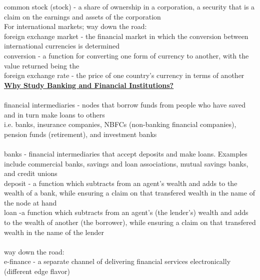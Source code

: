 \documentclass[12pt]{article}
\begin{document}
\noindent common stock (stock) - a share of ownership in a corporation, a security that is a claim on the earnings and assets of the corporation\\

\noindent For international markets; way down the road:\\
\noindent foreign exchange market - the financial market in which the conversion between international currencies is determined \\
\noindent conversion - a function for converting one form of currency to another, with the value returned being the \\
\noindent foreign exchange rate - the price of one country's currency in terms of another\\

\noindent \underline{\bf Why Study Banking and Financial Institutions?}\\

\\

\noindent financial intermediaries - nodes that borrow funds from people who have saved and in turn make loans to others\\
\noindent i.e. banks, insurance companies, NBFCs (non-banking financial companies), pension funds (retirement), and investment banks\\

\\

\noindent banks - financial intermediaries that accept deposits and make loans. Examples include commercial banks, savings and loan associations, mutual savings banks, and credit unions\\

\noindent deposit - a function which subtracts from an agent's wealth and adds to the wealth of a bank, while ensuring a claim on that transfered wealth in the name of the node at hand \\

\noindent loan -a function which subtracts from an agent's (the lender's) wealth and adds to the wealth of another (the borrower), while ensuring a claim on that transfered wealth in the name of the lender\\

\\

\noindent way down the road: \\
\noindent e-finance - a separate channel of delivering financial services electronically (different edge flavor)\\
\end{document}
